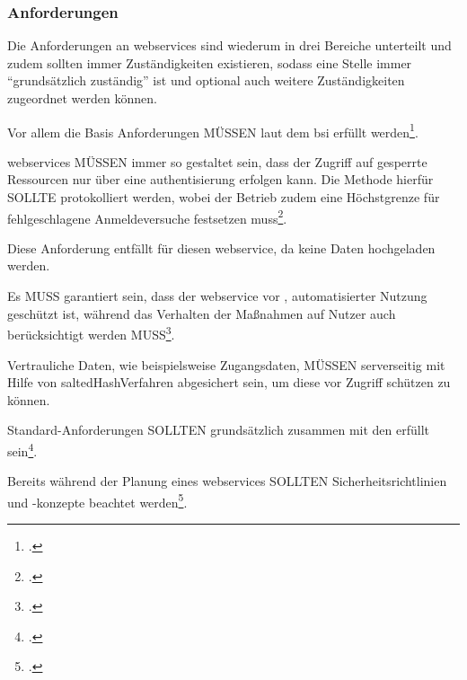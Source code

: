 \subsubsection{Anforderungen}\label{subsubsec:anforderungen-app.3.1}
	Die Anforderungen an \glspl{webservice} sind wiederum in drei Bereiche unterteilt
	und zudem sollten immer Zuständigkeiten existieren,
	sodass eine Stelle immer \enquote{grundsätzlich zuständig} ist
	und optional auch weitere Zuständigkeiten zugeordnet werden können.

	Vor allem die Basis Anforderungen MÜSSEN
	laut dem \gls{bsi} erfüllt werden\footcite[Vgl.][APP.3.1 S. 3]{holgerschildt2022}.

	\glspl{webservice} MÜSSEN immer so gestaltet sein,
	dass der Zugriff auf gesperrte Ressourcen nur über eine \gls{authentisierung} erfolgen kann.
	Die Methode hierfür SOLLTE protokolliert werden,
	wobei der Betrieb zudem eine Höchstgrenze
	für fehlgeschlagene Anmeldeversuche festsetzen muss\footcite[Vgl.][APP.3.1 S. 3]{holgerschildt2022}.

	Diese Anforderung entfällt für diesen \gls{webservice},
	da keine Daten hochgeladen werden.

	Es MUSS garantiert sein,
	dass der \gls{webservice} vor ,
	automatisierter Nutzung geschützt ist,
	während das Verhalten der Maßnahmen auf  Nutzer
	auch berücksichtigt werden MUSS\footcite[Vgl.][APP.3.1 S. 3]{holgerschildt2022}.

	Vertrauliche Daten,
	wie beispielsweise Zugangsdaten,
	MÜSSEN serverseitig mit Hilfe von \gls{saltedHashVerfahren} abgesichert sein,
	um diese vor  Zugriff schützen zu können.

	Standard-Anforderungen SOLLTEN grundsätzlich zusammen
	mit den  erfüllt sein\footcite[Vgl.][APP.3.2 S. 4]{holgerschildt2022}.

	Bereits während der Planung eines \glspl{webservice} SOLLTEN Sicherheitsrichtlinien
	und -konzepte beachtet werden\footcite[Vgl.][APP.3.1 S. 4]{holgerschildt2022}.

